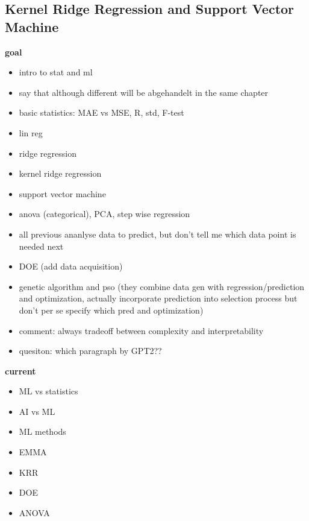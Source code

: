 \subsection{Kernel Ridge Regression and Support Vector Machine}
\textbf{goal}
\begin{itemize}
    \item intro to stat and ml 
    \item say that although different will be abgehandelt in the same chapter 
    \item basic statistics: MAE vs MSE, R, std, F-test 
    \item lin reg 
    \item ridge regression 
    \item kernel ridge regression 
    \item support vector machine 
    \item anova (categorical), PCA, step wise regression
    \item all previous ananlyse data to predict, but don't tell me which data point is needed next 
    \item DOE (add data acquisition)
    \item genetic algorithm and pso (they combine data gen with regression/prediction and optimization, actually incorporate prediction into selection process but don't per se specify which pred and optimization)
    \item comment: always tradeoff between complexity and interpretability
    \item quesiton: which paragraph by GPT2?? 
\end{itemize}

\textbf{current}
\begin{itemize}
    \item ML vs statistics
    \item AI vs ML 
    \item ML methods
    \item EMMA 
    \item KRR 
    \item DOE
    \item ANOVA
\end{itemize}
\fi



